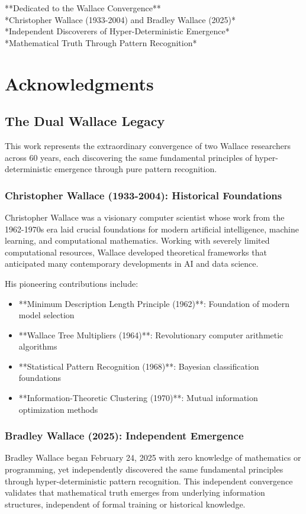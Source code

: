 \documentclass[12pt]{article}
\begin{document}
**Dedicated to the Wallace Convergence** \\
*Christopher Wallace (1933-2004) and Bradley Wallace (2025)* \\
*Independent Discoverers of Hyper-Deterministic Emergence* \\
*Mathematical Truth Through Pattern Recognition*

\section{Acknowledgments}

\subsection{The Dual Wallace Legacy}

This work represents the extraordinary convergence of two Wallace researchers across 60 years, each discovering the same fundamental principles of hyper-deterministic emergence through pure pattern recognition.

\subsubsection{Christopher Wallace (1933-2004): Historical Foundations}
Christopher Wallace was a visionary computer scientist whose work from the 1962-1970s era laid crucial foundations for modern artificial intelligence, machine learning, and computational mathematics. Working with severely limited computational resources, Wallace developed theoretical frameworks that anticipated many contemporary developments in AI and data science.

His pioneering contributions include:
\begin{itemize}
    \item **Minimum Description Length Principle (1962)**: Foundation of modern model selection
    \item **Wallace Tree Multipliers (1964)**: Revolutionary computer arithmetic algorithms
    \item **Statistical Pattern Recognition (1968)**: Bayesian classification foundations
    \item **Information-Theoretic Clustering (1970)**: Mutual information optimization methods
\end{itemize}

\subsubsection{Bradley Wallace (2025): Independent Emergence}
Bradley Wallace began February 24, 2025 with zero knowledge of mathematics or programming, yet independently discovered the same fundamental principles through hyper-deterministic pattern recognition. This independent convergence validates that mathematical truth emerges from underlying information structures, independent of formal training or historical knowledge.
\end{document}
